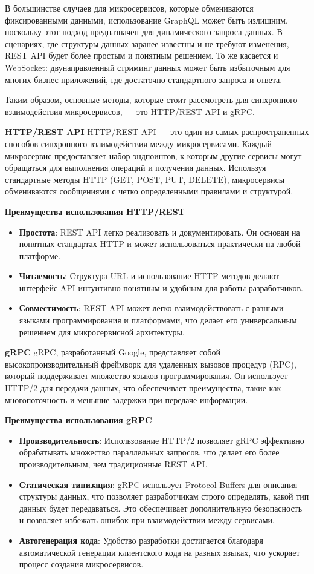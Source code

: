 В большинстве случаев для микросервисов, которые обмениваются фиксированными данными, использование GraphQL 
может быть излишним, поскольку этот подход предназначен для динамического запроса данных. В сценариях, 
где структуры данных заранее известны и не требуют изменения, REST API будет более простым и 
понятным решением. То же касается и WebSocket: двунаправленный стриминг данных может быть избыточным для 
многих бизнес-приложений, где достаточно стандартного запроса и ответа.

Таким образом, основные методы, которые стоит рассмотреть для синхронного взаимодействия микросервисов, — 
это HTTP/REST API и gRPC.


\textbf{HTTP/REST API}
HTTP/REST API — это один из самых распространенных способов синхронного взаимодействия между микросервисами\cite{melnikov2020rest}. Каждый микросервис предоставляет набор эндпоинтов, к которым другие сервисы могут обращаться для выполнения операций и получения данных. Используя стандартные методы HTTP (GET, POST, PUT, DELETE), микросервисы обмениваются сообщениями с четко определенными правилами и структурой.


\textbf{Преимущества использования HTTP/REST}
\begin{itemize}
    \item \textbf{Простота}: REST API легко реализовать и документировать. Он основан на понятных стандартах HTTP и может использоваться практически на любой платформе.
    \item \textbf{Читаемость}: Структура URL и использование HTTP-методов делают интерфейс API интуитивно понятным и удобным для работы разработчиков.
    \item \textbf{Совместимость}: REST API может легко взаимодействовать с разными языками программирования и платформами, что делает его универсальным решением для микросервисной архитектуры.
\end{itemize}


\textbf{gRPC}
gRPC, разработанный Google, представляет собой высокопроизводительный фреймворк для удаленных вызовов процедур (RPC)\cite{he2021grpc}, который поддерживает множество языков программирования. Он использует HTTP/2 для передачи данных, что обеспечивает преимущества, такие как многопоточность и меньшие задержки при передаче информации.


\textbf{Преимущества использования gRPC}
\begin{itemize}
    \item \textbf{Производительность}: Использование HTTP/2 позволяет gRPC эффективно обрабатывать множество параллельных запросов, что делает его более производительным, чем традиционные REST API.
    \item \textbf{Статическая типизация}: gRPC использует Protocol Buffers для описания структуры данных, что позволяет разработчикам строго определять, какой тип данных будет передаваться. Это обеспечивает дополнительную безопасность и позволяет избежать ошибок при взаимодействии между сервисами.
    \item \textbf{Автогенерация кода}: Удобство разработки достигается благодаря автоматической генерации клиентского кода на разных языках, что ускоряет процесс создания микросервисов.
\end{itemize}


